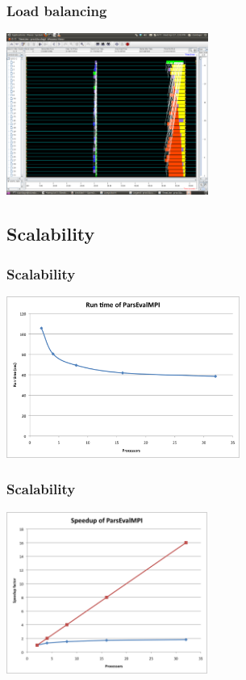 \documentclass{beamer}
\begin{document}
\begin{frame}
  \frametitle{Load balancing}
  \begin{center}
    \includegraphics[height=200px]{proc32-hg.png}
  \end{center}
\end{frame}

\subsection{Scalability}
\begin{frame}
  \frametitle{Scalability}
  \begin{center}
    \includegraphics[height=200px]{runtime.png}
  \end{center}
\end{frame}
\begin{frame}
  \frametitle{Scalability}
  \begin{center}
    \includegraphics[height=200px]{speedup.png}
  \end{center}
\end{frame}
\end{document}
